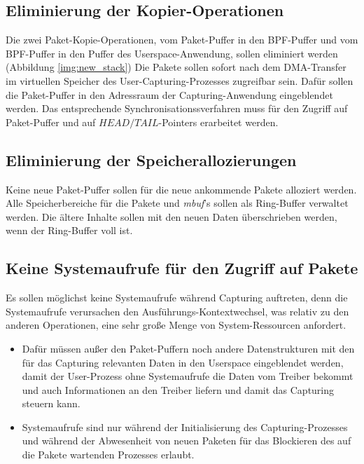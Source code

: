 \newpage
{}
\subsection{Eliminierung der Kopier-Operationen}
Die zwei Paket-Kopie-Operationen, vom Paket-Puffer in den BPF-Puffer und vom
BPF-Puffer in den Puffer des Userspace-Anwendung, sollen eliminiert werden
(Abbildung \ref{img:new_stack}) Die Pakete sollen sofort nach dem DMA-Transfer
im virtuellen Speicher des User-Capturing-Prozesses zugreifbar sein. Dafür
sollen die Paket-Puffer in den Adressraum der Capturing-Anwendung eingeblendet
werden. Das entsprechende Synchronisationssverfahren muss für den Zugriff auf 
Paket-Puffer und auf $HEAD/TAIL$-Pointers erarbeitet werden.
%
\subsection{Eliminierung der Speicherallozierungen}
Keine neue Paket-Puffer sollen für die neue ankommende Pakete alloziert werden. 
Alle Speicherbereiche für die Pakete und \emph{mbuf}'s sollen als Ring-Buffer 
verwaltet werden. Die ältere Inhalte sollen mit den neuen Daten überschrieben 
werden, wenn der Ring-Buffer voll ist. 
\subsection{Keine Systemaufrufe für den Zugriff auf Pakete}
Es sollen möglichst keine Systemaufrufe während Capturing auftreten, denn die
Systemaufrufe verursachen den Ausführungs-Kontextwechsel, was relativ zu den
anderen Operationen, eine sehr große Menge von System-Ressourcen anfordert.
		\begin{itemize}
			\item Dafür müssen außer den Paket-Puffern noch andere
				Datenstrukturen mit den für das Capturing relevanten Daten in den
				Userspace eingeblendet werden, damit der User-Prozess ohne
				Systemaufrufe die Daten vom Treiber bekommt und auch
				Informationen an den Treiber liefern und damit das Capturing
				steuern kann.
			\item   Systemaufrufe sind nur während der Initialisierung des
				Capturing-Prozesses 
				und während der Abwesenheit von neuen
				Paketen für das Blockieren des auf die Pakete wartenden
				Prozesses erlaubt. 
		\end{itemize}
